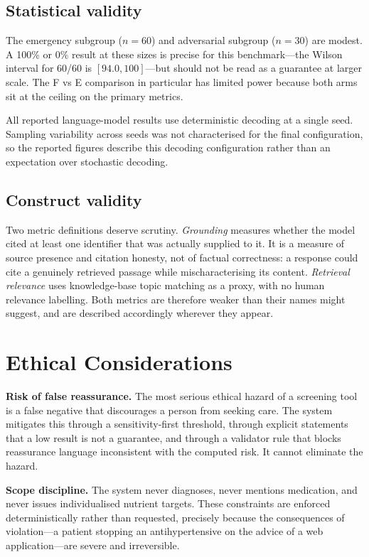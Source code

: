 \subsection{Statistical validity}

The emergency subgroup ($n=60$) and adversarial subgroup ($n=30$) are modest.
A 100\% or 0\% result at these sizes is precise for this benchmark---the Wilson
interval for 60/60 is $[94.0, 100]$---but should not be read as a guarantee at
larger scale. The F vs E comparison in particular has limited power because both
arms sit at the ceiling on the primary metrics.

All reported language-model results use deterministic decoding at a single seed.
Sampling variability across seeds was not characterised for the final
configuration, so the reported figures describe this decoding configuration
rather than an expectation over stochastic decoding.

\subsection{Construct validity}

Two metric definitions deserve scrutiny. \emph{Grounding} measures whether the
model cited at least one identifier that was actually supplied to it. It is a
measure of source presence and citation honesty, not of factual correctness: a
response could cite a genuinely retrieved passage while mischaracterising its
content. \emph{Retrieval relevance} uses knowledge-base topic matching as a
proxy, with no human relevance labelling. Both metrics are therefore weaker than
their names might suggest, and are described accordingly wherever they appear.

\section{Ethical Considerations}
\label{sec:ethics}

\textbf{Risk of false reassurance.} The most serious ethical hazard of a
screening tool is a false negative that discourages a person from seeking care.
The system mitigates this through a sensitivity-first threshold, through
explicit statements that a low result is not a guarantee, and through a
validator rule that blocks reassurance language inconsistent with the computed
risk. It cannot eliminate the hazard.

\textbf{Scope discipline.} The system never diagnoses, never mentions
medication, and never issues individualised nutrient targets. These constraints
are enforced deterministically rather than requested, precisely because the
consequences of violation---a patient stopping an antihypertensive on the advice
of a web application---are severe and irreversible.

